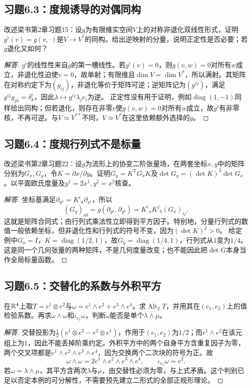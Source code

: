 \subsection*{习题6.3：度规诱导的对偶同构}
改述梁书第2章习题15：设$g$为有限维实空间$V$上的对称非退化双线性形式，证明$g^\flat(v)=g(v,\cdot)$是$V\to V^*$的同构。给出逆映射的分量，说明正定性是否必要；若$g$退化又如何？
\begin{proof}[解答]
$g^\flat$的线性性来自$g$的第一槽线性。若$g^\flat(v)=0$，则$g(v,w)=0$对所有$w$成立，非退化性迫使$v=0$，故单射；有限维且$\dim V=\dim V^*$，所以满射。其矩阵在对称约定下为$(g_{ij})$，非退化等价于矩阵可逆；逆矩阵记为$(g^{ij})$，满足$g^{ij}g_{jk}=\delta^i_k$，因此$\lambda\mapsto g^{ij}\lambda_j e_i$为逆。
正定性没有用于证明，例如$\operatorname{diag}(1,-1)$同样给出同构；但若退化，则存在非零$v$使$g(v,w)=0$对所有$w$成立，故$g^\flat$有非零核，不再可逆。与$V\simeq V^{**}$不同，$V\simeq V^*$在这里依赖额外选择的$g$。
\end{proof}

\subsection*{习题6.4：度规行列式不是标量}
改述梁书第2章习题22：设$g$为流形上的协变二阶张量场，在两套坐标$x,y$中的矩阵分别为$G_x,G_y$，令$K=\partial x/\partial y$。证明$G_y=K^{\mathsf T}G_xK$及$\det G_y=(\det K)^2\det G_x$。以平面欧氏度量及$y^1=2x^1,y^2=x^2$核查。
\begin{proof}[解答]
坐标基满足$\partial_{y^a}=K^i{}_a\partial_{x^i}$，所以
\[
 (G_y)_{ab}=g(\partial_{y^a},\partial_{y^b})
 =K^i{}_aK^j{}_b(G_x)_{ij}.
\]
这就是矩阵合同式；由行列式乘法性立即得到平方因子。特别地，分量行列式的数值一般依赖坐标，但非退化性和行列式的符号不变，因为$(\det K)^2>0$。
给定例中$G_x=I$，$K=\operatorname{diag}(1/2,1)$，故$G_y=\operatorname{diag}(1/4,1)$，行列式从$1$变为$1/4$。这是同一个几何张量的两种矩阵，不是几何度量改变；也不能因此把$\det G$本身当作全局标量函数。
\end{proof}

\subsection*{习题6.5：交替化的系数与外积平方}
在$\mathbb{R}^4$上取$T=e^1\otimes e^2$与$\omega=e^1\wedge e^2+e^3\wedge e^4$。求$\operatorname{Alt}_2T$，并用其在$(e_1,e_2)$上的值检验系数。再求$\omega\wedge\omega$和$\iota_{e_1}\omega$，判断$\omega$能否是单个$\lambda\wedge\mu$。
\begin{proof}[解答]
交替投影为$\tfrac12(e^1\otimes e^2-e^2\otimes e^1)$，作用于$(e_1,e_2)$为$1/2$；而$e^1\wedge e^2$在该元组上为$1$，因此不能丢掉阶乘约定。外积平方中的两个自身平方含重复因子为零，两个交叉项都是$e^1\wedge e^2\wedge e^3\wedge e^4$，因为交换两个二次块的符号为正。故
\[
 \omega\wedge\omega=2e^1\wedge e^2\wedge e^3\wedge e^4,
 \qquad \iota_{e_1}\omega=e^2.
\]
若$\omega=\lambda\wedge\mu$，其平方含两次$\lambda$与$\mu$，由交替性必须为零，与上式矛盾。这个判别已足以否定本例的可分解性，不需要预先建立二形式的全部正规形理论。
\end{proof}

